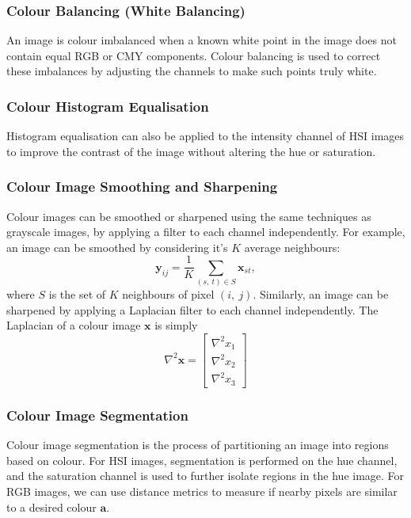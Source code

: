 \documentclass{article}
\begin{document}
\subsubsection{Colour Balancing (White Balancing)}
An image is colour imbalanced when a known white point in the image
does not contain equal RGB or CMY components. Colour balancing is used
to correct these imbalances by adjusting the channels to make such
points truly white.
\subsubsection{Colour Histogram Equalisation}
Histogram equalisation can also be applied to the intensity channel of
HSI images to improve the contrast of the image without altering the
hue or saturation.
\subsubsection{Colour Image Smoothing and Sharpening}
Colour images can be smoothed or sharpened using the same techniques as
grayscale images, by applying a filter to each channel independently.
For example, an image can be smoothed by considering it's \(K\) average
neighbours:
\begin{equation*}
    \symbf{y}_{ij} = \frac{1}{K} \sum_{\left( s,\: t \right) \in S} \symbf{x}_{st},
\end{equation*}
where \(S\) is the set of \(K\) neighbours of pixel \(\left( i,\: j \right)\).
Similarly, an image can be sharpened by applying a Laplacian filter to
each channel independently. The Laplacian of a colour image \(\symbf{x}\)
is simply
\begin{equation*}
    \nabla^2 \symbf{x} =
    \begin{bmatrix}
        \nabla^2 x_1 \\
        \nabla^2 x_2 \\
        \nabla^2 x_3
    \end{bmatrix}
\end{equation*}
\subsubsection{Colour Image Segmentation}
Colour image segmentation is the process of partitioning an image into
regions based on colour. For HSI images, segmentation is performed on
the hue channel, and the saturation channel is used to further isolate
regions in the hue image. For RGB images, we can use distance metrics
to measure if nearby pixels are similar to a desired colour
\(\symbf{a}\).
\end{document}

